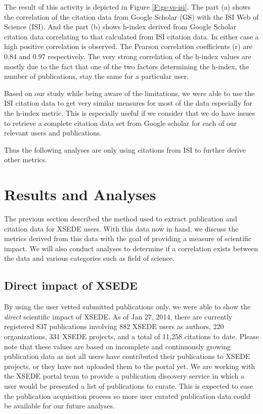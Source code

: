 \documentclass{sig-alternate}
\begin{document}
The result of this activity is depicted in Figure \ref{F:gs-vs-isi}. The part (a) shows the correlation of the citation data from Google Scholar (GS) with the ISI Web of Science (ISI). And the part (b) shows h-index derived from Google Scholar citation data correlating to that calculated from ISI citation data. In either case a high positive correlation is observed. The Pearson correlation coefficients (r) are 0.84 and 0.97 respectively. The very strong correlation of the h-index values are mostly due to the fact that one of the two factors determining the h-index, the number of publications, stay the same for a particular user. 

Based on our study while being aware of the limitations, we were able to use the ISI citation data to get very similar measures for most of the data especially for the h-index metric. This is especially useful if we consider that we do have issues to retrieve a complete citation data set from Google scholar for each of our relevant users and publications.

Thus the following analyses are only using citations from ISI to further derive other metrics. 

\section{Results and Analyses} \label{S:result}

The previous section described the method used to extract publication and citation data for XSEDE users.  With this data now in hand, we discuss the metrics derived from this data with the goal of providing a measure of scientific impact. We will also conduct analyses to determine if a correlation exists between the data and various categories such as field of science. 
 
\subsection{Direct impact of XSEDE} 
 
By using the user vetted submitted publications only, we were able to show the \emph{direct} scientific impact of XSEDE.  As of Jan 27, 2014, there are currently registered 837 publications involving 882 XSEDE users as authors, 220 organizations, 331 XSEDE projects, and a total of 11,258 citations to date. Please note that these values are based on incomplete and continuously growing publication data as not all users have contributed their publications to XSEDE projects, or they have not uploaded them to the portal yet. We are working with the XSEDE portal team to provide a publication discovery service in which a user would be presented a list of publications to curate. This is expected to ease the publication acquisition process so more user curated publication data could be available for our future analyses.
\end{document}
